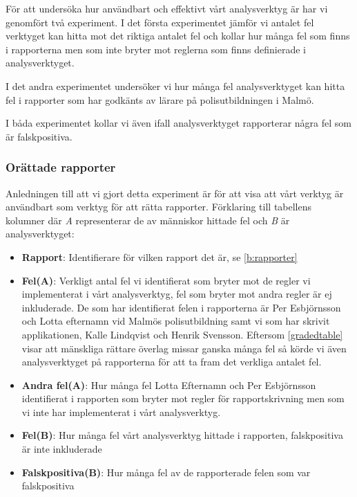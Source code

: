 \documentclass[swedish]{maucsthesis}
\begin{document}
För att undersöka hur användbart och effektivt vårt analysverktyg är har vi genomfört två experiment.
I det första experimentet jämför vi antalet fel verktyget kan hitta mot det riktiga
antalet fel och kollar hur många fel som finns i rapporterna men som inte bryter mot
reglerna som finns definierade i analysverktyget. 

I det andra experimentet undersöker vi hur många fel analysverktyget kan hitta fel i rapporter
som har godkänts av lärare på polisutbildningen i Malmö.

I båda experimentet kollar vi även ifall analysverktyget rapporterar några fel som är
falskpositiva.

\subsubsection{Orättade rapporter}

Anledningen till att vi gjort detta experiment är för att visa att vårt verktyg är användbart som verktyg för att rätta rapporter.
Förklaring till tabellens kolumner där \textit{A} representerar de av människor hittade fel och \textit{B} är analysverktyget:

\begin{itemize}
\item \textbf{Rapport}: Identifierare för vilken rapport det är, se \cref{b:rapporter}
\item \textbf{Fel(A)}: Verkligt antal fel vi identifierat som bryter mot de regler vi implementerat i vårt analysverktyg, fel som bryter mot andra regler är ej inkluderade. De som har identifierat felen i rapporterna är Per Esbjörnsson och Lotta efternamn vid Malmös polisutbildning samt vi som har skrivit applikationen, Kalle Lindqvist och Henrik Svensson. Eftersom \cref{gradedtable} visar att mänskliga rättare överlag missar ganska många fel så körde vi även analysverktyget på rapporterna för att ta fram det verkliga antalet fel.
\item \textbf{Andra fel(A)}: Hur många fel Lotta Efternamn och Per Esbjörnsson identifierat i rapporten som bryter mot regler för rapportskrivning men som vi inte har implementerat i vårt analysverktyg.
\item \textbf{Fel(B)}: Hur många fel vårt analysverktyg hittade i rapporten, falskpositiva är inte inkluderade
\item \textbf{Falskpositiva(B)}: Hur många fel av de rapporterade felen som var falskpositiva
\end{itemize}
\end{document}
